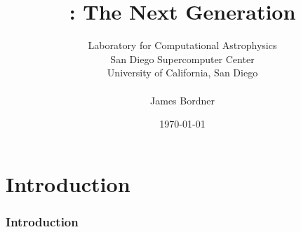 \documentclass{beamer}
\title[\enzo: The Next Generation]
      {\enzo: The Next Generation}
\author[James Bordner]{\small Laboratory for Computational Astrophysics \\ San Diego Supercomputer Center \\ University of California, San Diego \\ \ \\ James Bordner}
\date{\today}
\begin{document}


% 

\part{Introduction}

\section{Introduction}


\end{document}
